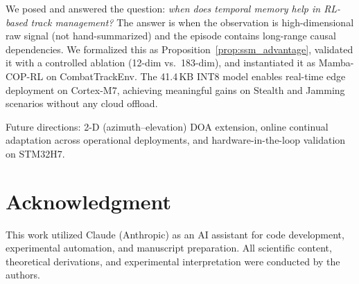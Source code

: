 \documentclass[conference]{IEEEtran}
\begin{document}
We posed and answered the question: \emph{when does temporal memory
help in RL-based track management?}
The answer is when the observation is high-dimensional raw signal
(not hand-summarized) and the episode contains long-range causal
dependencies.
We formalized this as Proposition~\ref{prop:ssm_advantage},
validated it with a controlled ablation (12-dim vs.\ 183-dim),
and instantiated it as Mamba-COP-RL on CombatTrackEnv.
The 41.4\,KB INT8 model enables real-time edge deployment on
Cortex-M7, achieving meaningful gains on Stealth and Jamming
scenarios without any cloud offload.

Future directions: 2-D (azimuth--elevation) DOA extension,
online continual adaptation across operational deployments,
and hardware-in-the-loop validation on STM32H7.


\section*{Acknowledgment}
This work utilized Claude (Anthropic) as an AI assistant for code
development, experimental automation, and manuscript preparation.
All scientific content, theoretical derivations, and experimental
interpretation were conducted by the authors.




\end{document}
